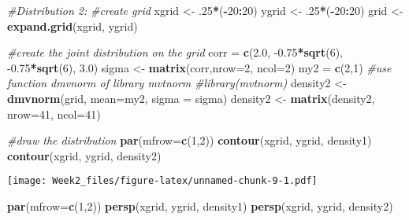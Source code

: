 \documentclass[]{article}
\newenvironment{Shaded}{\begin{snugshade}}{\end{snugshade}}
\newcommand{\CommentTok}[1]{\textcolor[rgb]{0.56,0.35,0.01}{\textit{#1}}}
\newcommand{\DataTypeTok}[1]{\textcolor[rgb]{0.13,0.29,0.53}{#1}}
\newcommand{\DecValTok}[1]{\textcolor[rgb]{0.00,0.00,0.81}{#1}}
\newcommand{\FloatTok}[1]{\textcolor[rgb]{0.00,0.00,0.81}{#1}}
\newcommand{\KeywordTok}[1]{\textcolor[rgb]{0.13,0.29,0.53}{\textbf{#1}}}
\newcommand{\NormalTok}[1]{#1}
\newcommand{\OperatorTok}[1]{\textcolor[rgb]{0.81,0.36,0.00}{\textbf{#1}}}
\newcommand{\StringTok}[1]{\textcolor[rgb]{0.31,0.60,0.02}{#1}}
\begin{document}
\begin{Shaded}
\begin{Highlighting}[]
\CommentTok{#Distribution 2:}
\CommentTok{#create grid }
\NormalTok{xgrid <-}\StringTok{ }\FloatTok{.25}\OperatorTok{*}\NormalTok{(}\OperatorTok{-}\DecValTok{20}\OperatorTok{:}\DecValTok{20}\NormalTok{)}
\NormalTok{ygrid <-}\StringTok{ }\FloatTok{.25}\OperatorTok{*}\NormalTok{(}\OperatorTok{-}\DecValTok{20}\OperatorTok{:}\DecValTok{20}\NormalTok{)}
\NormalTok{grid <-}\StringTok{ }\KeywordTok{expand.grid}\NormalTok{(xgrid, ygrid)}

\CommentTok{#create the joint distribution on the grid}
\NormalTok{corr =}\StringTok{ }\KeywordTok{c}\NormalTok{(}\FloatTok{2.0}\NormalTok{, }\FloatTok{-0.75}\OperatorTok{*}\KeywordTok{sqrt}\NormalTok{(}\DecValTok{6}\NormalTok{), }\FloatTok{-0.75}\OperatorTok{*}\KeywordTok{sqrt}\NormalTok{(}\DecValTok{6}\NormalTok{), }\FloatTok{3.0}\NormalTok{)}
\NormalTok{sigma <-}\StringTok{ }\KeywordTok{matrix}\NormalTok{(corr,}\DataTypeTok{nrow=}\DecValTok{2}\NormalTok{, }\DataTypeTok{ncol=}\DecValTok{2}\NormalTok{)}
\NormalTok{my2 =}\StringTok{ }\KeywordTok{c}\NormalTok{(}\DecValTok{2}\NormalTok{,}\DecValTok{1}\NormalTok{)}
\CommentTok{#use function dmvnorm of library mvtnorm}
\CommentTok{#library(mvtnorm)}
\NormalTok{density2 <-}\StringTok{ }\KeywordTok{dmvnorm}\NormalTok{(grid, }\DataTypeTok{mean=}\NormalTok{my2, }\DataTypeTok{sigma =}\NormalTok{ sigma)}
\NormalTok{density2 <-}\StringTok{ }\KeywordTok{matrix}\NormalTok{(density2, }\DataTypeTok{nrow=}\DecValTok{41}\NormalTok{, }\DataTypeTok{ncol=}\DecValTok{41}\NormalTok{)}

\CommentTok{#draw the distribution}
\KeywordTok{par}\NormalTok{(}\DataTypeTok{mfrow=}\KeywordTok{c}\NormalTok{(}\DecValTok{1}\NormalTok{,}\DecValTok{2}\NormalTok{))}
\KeywordTok{contour}\NormalTok{(xgrid, ygrid, density1)}
\KeywordTok{contour}\NormalTok{(xgrid, ygrid, density2)}
\end{Highlighting}
\end{Shaded}

\texttt{[image: Week2\_files/figure-latex/unnamed-chunk-9-1.pdf]}

\begin{Shaded}
\begin{Highlighting}[]
\KeywordTok{par}\NormalTok{(}\DataTypeTok{mfrow=}\KeywordTok{c}\NormalTok{(}\DecValTok{1}\NormalTok{,}\DecValTok{2}\NormalTok{))}
\KeywordTok{persp}\NormalTok{(xgrid, ygrid, density1)}
\KeywordTok{persp}\NormalTok{(xgrid, ygrid, density2)}
\end{Highlighting}
\end{Shaded}
\end{document}
